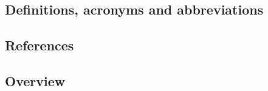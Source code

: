 
\subsection{Definitions, acronyms and abbreviations}
\subsection{References}
\subsection{Overview}
